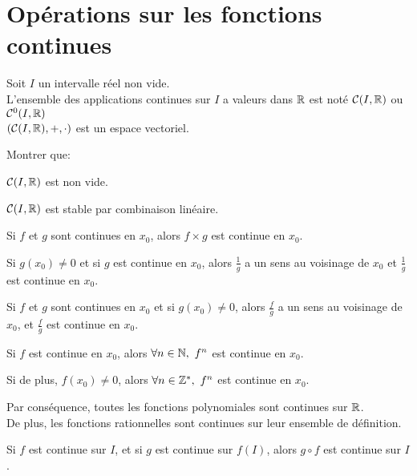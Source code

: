\documentclass[12pt,twoside,a4paper]{article}
\begin{document}
	\section{Opérations sur les fonctions continues}
		\begin{prop}
			Soit $I$ un intervalle réel non vide.\\
			L'ensemble des applications continues sur $I$ a valeurs dans $\mathbb{R}$ est noté $\mathcal{C}(I,\mathbb{R})$ ou $\mathcal{C}^{0}(I,\mathbb{R})$\\
			$\left(\mathcal{C}(I,\mathbb{R}),+,\cdot \right)$ est un espace vectoriel.
		\end{prop}
		\begin{preuve}
			Montrer que:
			\begin{liste}
				\item $\mathcal{C}(I,\mathbb{R})$ est non vide.
				\item $\mathcal{C}(I,\mathbb{R})$ est stable par combinaison linéaire.
			\end{liste}
		\end{preuve}
		\begin{prop}
			\begin{liste}
				\item Si $f$ et $g$ sont continues en $x_0$, alors $f\times g$ est continue en $x_0$.
				\item Si $g(x_0)\neq 0$ et si $g$ est continue en $x_0$, alors $\frac1g$ a un sens au voisinage de $x_0$ et $\frac1g$ est continue en $x_0$.
				\item Si $f$ et $g$ sont continues en $x_0$ et si $g(x_0)\neq 0$, alors $\frac{f}g$ a un sens au voisinage de $x_0$, et $\frac{f}g$ est continue en $x_0$.
			\end{liste}
		\end{prop}
		\begin{coro}
			\begin{liste}
				\item Si $f$ est continue en $x_0$, alors $\forall n\in\mathbb{N},\ f^n$ est continue en $x_0$.
				\item Si de plus, $f(x_0)\neq0$, alors $\forall n\in\mathbb{Z}^*,\ f^n$ est continue en $x_0$.
			\end{liste}
		\end{coro}
		\begin{flushleft}
			Par conséquence, toutes les fonctions polynomiales sont continues sur $\mathbb{R}$.\\
			De plus, les fonctions rationnelles sont continues sur leur ensemble de définition.
		\end{flushleft}
		\begin{prop}
			Si $f$ est continue sur $I$, et si $g$ est continue sur $f(I)$, alors $g\circ f$ est continue sur $I$.
		\end{prop}
\end{document}
